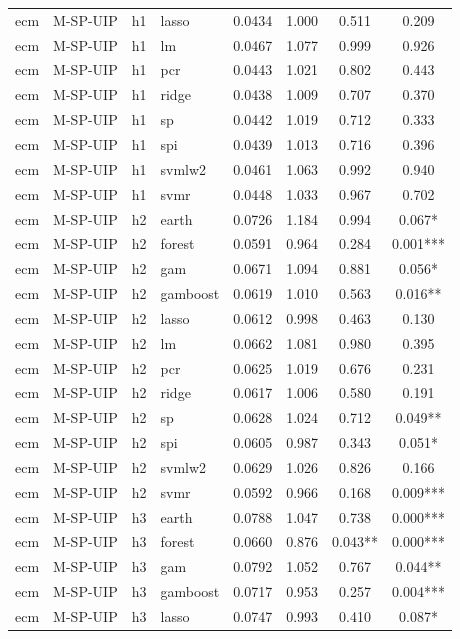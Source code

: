 \begin{ThreePartTable}
\begin{longtable}[t]{llclcccc}
ecm & M-SP-UIP & h1 & lasso & 0.0434 & 1.000 & 0.511 & 0.209\\
ecm & M-SP-UIP & h1 & lm & 0.0467 & 1.077 & 0.999 & 0.926\\
ecm & M-SP-UIP & h1 & pcr & 0.0443 & 1.021 & 0.802 & 0.443\\
ecm & M-SP-UIP & h1 & ridge & 0.0438 & 1.009 & 0.707 & 0.370\\
ecm & M-SP-UIP & h1 & sp & 0.0442 & 1.019 & 0.712 & 0.333\\
ecm & M-SP-UIP & h1 & spi & 0.0439 & 1.013 & 0.716 & 0.396\\
ecm & M-SP-UIP & h1 & svmlw2 & 0.0461 & 1.063 & 0.992 & 0.940\\
ecm & M-SP-UIP & h1 & svmr & 0.0448 & 1.033 & 0.967 & 0.702\\
\addlinespace
ecm & M-SP-UIP & h2 & earth & 0.0726 & 1.184 & 0.994 & 0.067*\\
ecm & M-SP-UIP & h2 & forest & 0.0591 & 0.964 & 0.284 & 0.001***\\
ecm & M-SP-UIP & h2 & gam & 0.0671 & 1.094 & 0.881 & 0.056*\\
ecm & M-SP-UIP & h2 & gamboost & 0.0619 & 1.010 & 0.563 & 0.016**\\
ecm & M-SP-UIP & h2 & lasso & 0.0612 & 0.998 & 0.463 & 0.130\\
ecm & M-SP-UIP & h2 & lm & 0.0662 & 1.081 & 0.980 & 0.395\\
ecm & M-SP-UIP & h2 & pcr & 0.0625 & 1.019 & 0.676 & 0.231\\
ecm & M-SP-UIP & h2 & ridge & 0.0617 & 1.006 & 0.580 & 0.191\\
ecm & M-SP-UIP & h2 & sp & 0.0628 & 1.024 & 0.712 & 0.049**\\
ecm & M-SP-UIP & h2 & spi & 0.0605 & 0.987 & 0.343 & 0.051*\\
ecm & M-SP-UIP & h2 & svmlw2 & 0.0629 & 1.026 & 0.826 & 0.166\\
ecm & M-SP-UIP & h2 & svmr & 0.0592 & 0.966 & 0.168 & 0.009***\\
\addlinespace
ecm & M-SP-UIP & h3 & earth & 0.0788 & 1.047 & 0.738 & 0.000***\\
ecm & M-SP-UIP & h3 & forest & 0.0660 & 0.876 & 0.043** & 0.000***\\
ecm & M-SP-UIP & h3 & gam & 0.0792 & 1.052 & 0.767 & 0.044**\\
ecm & M-SP-UIP & h3 & gamboost & 0.0717 & 0.953 & 0.257 & 0.004***\\
ecm & M-SP-UIP & h3 & lasso & 0.0747 & 0.993 & 0.410 & 0.087*\\

\end{longtable}
\end{ThreePartTable}
